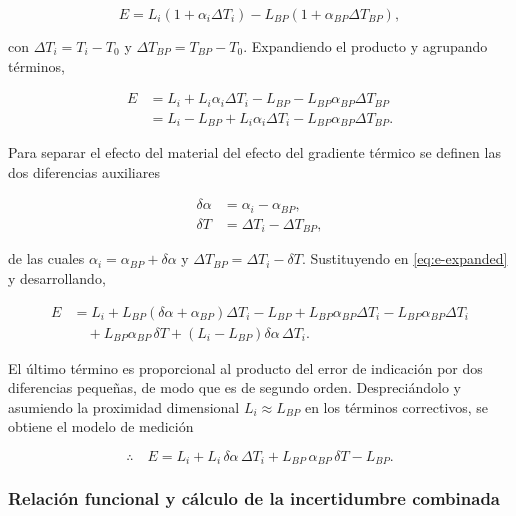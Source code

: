 \begin{equation}
  E = L_i (1 + \alpha_i \Delta T_i) - L_{BP} (1 + \alpha_{BP} \Delta T_{BP}),
  \label{eq:e-termal}
\end{equation}

con $\Delta T_i = T_i - T_0$ y $\Delta T_{BP} = T_{BP} - T_0$. Expandiendo el
producto y agrupando términos,

\begin{align}
  E &= L_i + L_i \alpha_i \Delta T_i - L_{BP} - L_{BP} \alpha_{BP} \Delta T_{BP}
  \nonumber\\
  &= L_i - L_{BP} + L_i \alpha_i \Delta T_i - L_{BP} \alpha_{BP} \Delta T_{BP}.
  \label{eq:e-expanded}
\end{align}

Para separar el efecto del material del efecto del gradiente térmico se definen las
dos diferencias auxiliares

\begin{align}
  \delta\alpha &= \alpha_i - \alpha_{BP}, \label{eq:dalpha} \\
  \delta T &= \Delta T_i - \Delta T_{BP}, \label{eq:dT}
\end{align}

de las cuales $\alpha_i = \alpha_{BP} + \delta\alpha$ y
$\Delta T_{BP} = \Delta T_i - \delta T$. Sustituyendo en
\eqref{eq:e-expanded} y desarrollando,

\begin{align}
  E &= L_i + L_{BP}\left(\delta\alpha + \alpha_{BP}\right)\Delta T_i
     - L_{BP} + L_{BP}\alpha_{BP}\Delta T_i
     - L_{BP}\alpha_{BP}\Delta T_i \nonumber\\
  &\quad + L_{BP}\alpha_{BP}\,\delta T
     + \left(L_i - L_{BP}\right)\delta\alpha\,\Delta T_i .
\end{align}

El último término es proporcional al producto del error de indicación por dos
diferencias pequeñas, de modo que es de segundo orden. Despreciándolo y asumiendo la
proximidad dimensional $L_i \approx L_{BP}$ en los términos correctivos, se obtiene
el modelo de medición

\begin{equation}
  \therefore\quad
  E = L_i + L_i \, \delta\alpha \, \Delta T_i + L_{BP} \, \alpha_{BP} \, \delta T
  - L_{BP}.
  \label{eq:e-model}
\end{equation}

\subsubsection*{Relación funcional y cálculo de la incertidumbre combinada}

